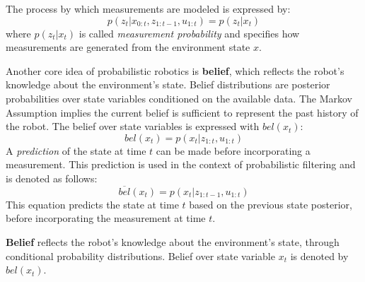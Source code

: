 The process by which measurements are modeled is expressed by:
\begin{equation}
\label{eq:background_measurement_prob}
p(z_t | x_{0:t}, z_{1:t-1}, u_{1:t}) = p(z_t | x_t)
\end{equation}
where $p(z_t | x_t)$ is called \textit{measurement probability} and specifies how measurements are generated from the environment state $x$.

Another core idea of probabilistic robotics is \textbf{belief}, which reflects the robot's knowledge about the environment's state.
Belief distributions are posterior probabilities over state variables conditioned on the available data.
The Markov Assumption implies the current belief is sufficient to represent the past history of the robot.
The belief over state variables is expressed with $bel(x_t)$:
\begin{equation}
bel(x_t) = p(x_t | z_{1:t}, u_{1:t})
\end{equation}
A \textit{prediction} of the state at time $t$ can be made before incorporating a measurement.
This prediction is used in the context of probabilistic filtering and is denoted as follows:
\begin{equation}
\overline{bel}(x_t) = p(x_t | z_{1:t-1}, u_{1:t})
\end{equation}
This equation predicts the state at time $t$ based on the previous state posterior, before incorporating the measurement at time $t$.

\begin{mydef}
\textbf{Belief} reflects the robot's knowledge about the environment's state, through conditional probability distributions.
Belief over state variable $x_t$ is denoted by $bel(x_t)$.
\end{mydef}

